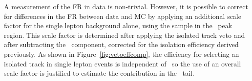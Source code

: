 

A measurement of the FR in data is non-trivial. However, it is
possible to correct for differences in the FR between data and MC by
applying an additional scale factor for the single lepton background
alone, using the sample in the \mt\ peak region. This scale factor is determined after applying the isolated track
veto and after subtracting the \ttll\ component, corrected for the
isolation efficiency derived previously. 
As shown in Figure~\ref{fig:vetoeffcomp}, the efficiency for selecting an
isolated track in single lepton events is independent of \mt\, so the use of
an overall scale factor is justified to estimate the contribution in
the \mt\ tail. 

